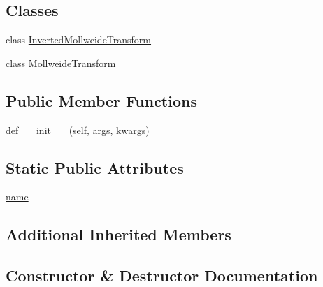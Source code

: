 \subsection*{Classes}
\begin{DoxyCompactItemize}
\item 
class \hyperlink{classmatplotlib_1_1projections_1_1geo_1_1MollweideAxes_1_1InvertedMollweideTransform}{Inverted\+Mollweide\+Transform}
\item 
class \hyperlink{classmatplotlib_1_1projections_1_1geo_1_1MollweideAxes_1_1MollweideTransform}{Mollweide\+Transform}
\end{DoxyCompactItemize}
\subsection*{Public Member Functions}
\begin{DoxyCompactItemize}
\item 
def \hyperlink{classmatplotlib_1_1projections_1_1geo_1_1MollweideAxes_ad1a8c18067bf6bc99214fc41b28ad5c2}{\+\_\+\+\_\+init\+\_\+\+\_\+} (self, args, kwargs)
\end{DoxyCompactItemize}
\subsection*{Static Public Attributes}
\begin{DoxyCompactItemize}
\item 
\hyperlink{classmatplotlib_1_1projections_1_1geo_1_1MollweideAxes_a6e034a04678e41af56fca5bcc35715ab}{name}
\end{DoxyCompactItemize}
\subsection*{Additional Inherited Members}


\subsection{Constructor \& Destructor Documentation}
\mbox{\label{classmatplotlib_1_1projections_1_1geo_1_1MollweideAxes_ad1a8c18067bf6bc99214fc41b28ad5c2}} 
